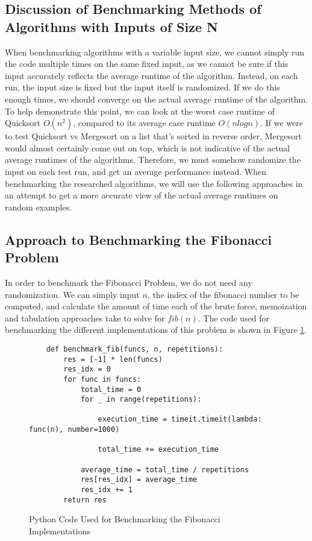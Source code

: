 \subsection{Discussion of Benchmarking Methods of Algorithms with Inputs of Size N}
When benchmarking algorithms with a variable input size, we cannot simply run the code multiple times on the same fixed input,
as we cannot be sure if this input accurately reflects the average runtime of the algorithm.
Instead, on each run, the input size is fixed but the input itself is randomized.
If we do this enough times, we should converge on the actual average runtime of the algorithm.
To help demonstrate this point, we can look at the worst case runtime of Quicksort $O(n^2)$, compared to its average case runtime $O(nlogn)$.
If we were to test Quicksort vs Mergesort on a list that's sorted in reverse order, Mergesort would almost certainly come out on top, which is not indicative of the actual average runtimes of the algorithms.
Therefore, we must somehow randomize the input on each test run, and get an average performance instead.
When benchmarking the researched algorithms, we will use the following approaches in an attempt to get a more accurate view of the actual average runtimes on random examples.


\subsection{Approach to Benchmarking the Fibonacci Problem}

In order to benchmark the Fibonacci Problem, we do not need any randomization. We can simply input $n$, the index of the fibonacci number to be computed, and calculate the amount of time each of the brute force, memoization and tabulation approaches take to solve for $fib(n)$.
The code used for benchmarking the different implementations of this problem is shown in Figure \ref{fig:bm-fibonacci}.

\begin{figure}[H]
    \centering
    \begin{lstlisting}
    def benchmark_fib(funcs, n, repetitions):
        res = [-1] * len(funcs)
        res_idx = 0
        for func in funcs:
            total_time = 0
            for _ in range(repetitions):
    
                execution_time = timeit.timeit(lambda: func(n), number=1000)
    
                total_time += execution_time
    
            average_time = total_time / repetitions
            res[res_idx] = average_time
            res_idx += 1
        return res
    \end{lstlisting}
    \caption{Python Code Used for Benchmarking the Fibonacci Implementations}
    \label{fig:bm-fibonacci}
\end{figure}

